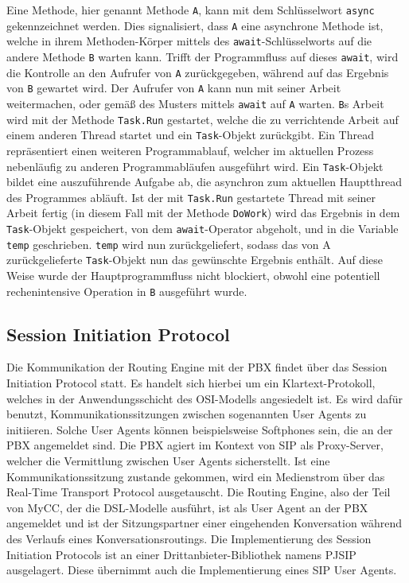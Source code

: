 \noindent Eine Methode, hier genannt Methode \texttt{A}, kann mit dem Schlüsselwort \texttt{async} gekennzeichnet werden. Dies signalisiert, dass \texttt{A} eine asynchrone Methode ist, welche in ihrem Methoden-Körper mittels des \texttt{await}-Schlüsselworts auf die andere Methode \texttt{B} warten kann. Trifft der Programmfluss auf dieses \texttt{await}, wird die Kontrolle an den Aufrufer von \texttt{A} zurückgegeben, während auf das Ergebnis von \texttt{B} gewartet wird. Der Aufrufer von \texttt{A} kann nun mit seiner Arbeit weitermachen, oder gemäß des Musters mittels \texttt{await} auf \texttt{A} warten. \texttt{B}s Arbeit wird mit der Methode \texttt{Task.Run} gestartet, welche die zu verrichtende Arbeit auf einem anderen Thread startet und ein \texttt{Task}-Objekt zurückgibt. Ein Thread repräsentiert einen weiteren Pro\-gramm\-ab\-lauf, welcher im aktuellen Prozess nebenläufig zu anderen Programmabläufen ausgeführt wird. Ein \texttt{Task}-Objekt bildet eine auszuführende Aufgabe ab, die asynchron zum aktuellen Hauptthread des Programmes abläuft. Ist der mit \texttt{Task.Run} gestartete Thread mit seiner Arbeit fertig (in diesem Fall mit der Methode \texttt{DoWork}) wird das Ergebnis in dem \texttt{Task}-Objekt gespeichert, von dem \texttt{await}-Operator abgeholt, und in die Variable \texttt{temp} geschrieben. \texttt{temp} wird nun zurückgeliefert, sodass das von A zurückgelieferte \texttt{Task}-Objekt nun das gewünschte Ergebnis enthält. Auf diese Weise wurde der Hauptprogrammfluss nicht blockiert, obwohl eine potentiell rechenintensive Operation in \texttt{B} ausgeführt wurde.

\subsection{Session Initiation Protocol}
\label{subsec:Session Initiation Protocol}
Die Kommunikation der Routing Engine mit der PBX findet über das Session Initiation Protocol statt. Es handelt sich hierbei um ein Klartext-Protokoll, welches in der Anwendungsschicht des OSI-Modells angesiedelt ist. Es wird dafür benutzt, Kommunikationssitzungen zwischen sogenannten User Agents zu initiieren. Solche User Agents können beispielsweise Softphones sein, die an der PBX angemeldet sind. Die PBX agiert im Kontext von SIP als Proxy-Server, welcher die Vermittlung zwischen User Agents sicherstellt. Ist eine Kommunikationssitzung zustande gekommen, wird ein Medienstrom über das Real-Time Transport Protocol ausgetauscht. Die Routing Engine, also der Teil von MyCC, der die DSL-Modelle ausführt, ist als User Agent an der PBX angemeldet und ist der Sitzungspartner einer eingehenden Konversation während des Verlaufs eines Konversationsroutings. Die Implementierung des Session Initiation Protocols ist an einer Drittanbieter-Bibliothek namens PJSIP ausgelagert. Diese übernimmt auch die Implementierung eines SIP User Agents. 

